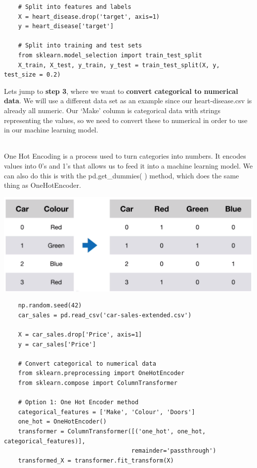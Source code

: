 \documentclass[11pt, a4paper]{article}
\begin{document}
\begin{spacing}{1.1}
\begin{lstlisting}
	# Split into features and labels
	X = heart_disease.drop('target', axis=1)
	y = heart_disease['target']
	
	# Split into training and test sets
	from sklearn.model_selection import train_test_split
	X_train, X_test, y_train, y_test = train_test_split(X, y, test_size = 0.2) \end{lstlisting} \vspace*{1mm}
	Lets jump to \textbf{step 3}, where we want to \textbf{convert categorical to numerical data}. We will use a different data set as an example since our heart-disease.csv is already all numeric. Our `Make' column is categorical data with strings representing the values, so we need to convert these to numerical in order to use in our machine learning model. \\~\\
	\begin{minipage}[c]{9.3cm}
	One Hot Encoding is a process used to turn categories into numbers. It encodes values into 0's and 1's that allows us to feed it into a machine learning model. We can also do this is with the pd.get\_dummies( ) method, which does the same thing as OneHotEncoder.
	\end{minipage} 
	\begin{minipage}[c]{9cm}
	\hspace*{2mm} \includegraphics[scale=.28]{ohe}
	\end{minipage}
	\begin{lstlisting}
	np.random.seed(42)
	car_sales = pd.read_csv('car-sales-extended.csv')
	
	X = car_sales.drop['Price', axis=1]
	y = car_sales['Price']
		
	# Convert categorical to numerical data
	from sklearn.preprocessing import OneHotEncoder
	from sklearn.compose import ColumnTransformer
	
	# Option 1: One Hot Encoder method
	categorical_features = ['Make', 'Colour', 'Doors']
	one_hot = OneHotEncoder()
	transformer = ColumnTransformer([('one_hot', one_hot, categorical_features)], 
	                                remainder='passthrough')
	transformed_X = transformer.fit_transform(X)
	

\end{lstlisting}
\end{spacing}
\end{document}
